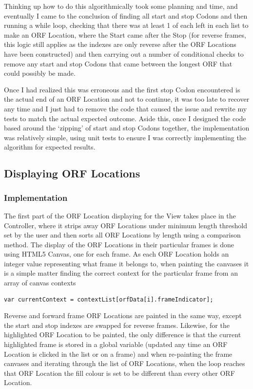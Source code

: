 Thinking up how to do this algorithmically took some planning and time, and eventually I came to the conclusion of finding all start and stop Codons and then running a while loop, checking that there was at least 1 of each left in each list to make an ORF Location, where the Start came after the Stop (for reverse frames, this logic still applies as the indexes are only reverse after the ORF Locations have been constructed) and then carrying out a number of conditional checks to remove any start and stop Codons that came between the longest ORF that could possibly be made.

Once I had realized this was erroneous and the first stop Codon encountered is the actual end of an ORF Location and not to continue, it was too late to recover any time and I just had to remove the code that caused the issue and rewrite my tests to match the actual expected outcome. Aside this, once I designed the code based around the `zipping' of start and stop Codons together, the implementation was relatively simple, using unit tests to ensure I was correctly implementing the algorithm for expected results.

\subsection{Displaying ORF Locations}
\subsubsection{Implementation}
The first part of the ORF Location displaying for the View takes place in the Controller, where it strips away ORF Locations under minimum length threshold set by the user and then sorts all ORF Locations by length using a comparison method. The display of the ORF Locations in their particular frames is done using HTML5 Canvas, one for each frame. As each ORF Location holds an integer value representing what frame it belongs to, when painting the canvases it is a simple matter finding the correct context  for the particular frame from an array of canvas contexts
\begin{verbatim}
var currentContext = contextList[orfData[i].frameIndicator];
\end{verbatim}
Reverse and forward frame ORF Locations are painted in the same way, except the start and stop indexes are swapped for reverse frames. Likewise, for the highlighted ORF Location to be painted, the only difference is that the current highlighted frame is stored in a global variable (updated any time an ORF Location is clicked in the list or on a frame) and when re-painting the frame canvases and iterating through the list of ORF Locations, when the loop reaches that ORF Location the fill colour is set to be different than every other ORF Location.

